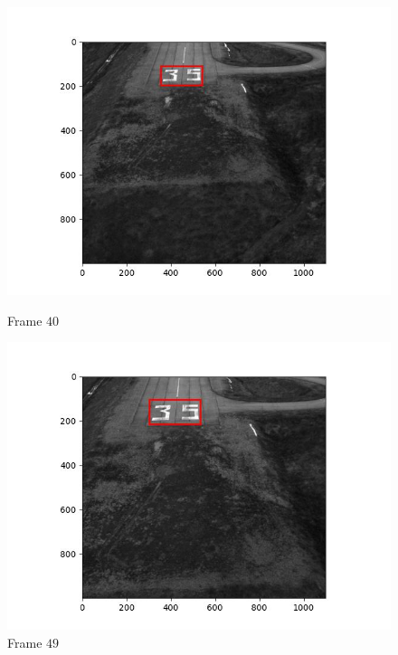 \begin{figure}[H]
\begin{minipage}{.49\textwidth}
    \includegraphics[width=\textwidth]{./figures/lk_affine/landing/frame000040.jpg}
    \caption{Frame $40$}
  \end{minipage}
  \hfill
  \begin{minipage}{.49\textwidth}
    \centering
    \includegraphics[width=\textwidth]{./figures/lk_affine/landing/frame000049.jpg}
    \caption{Frame $49$}
  \end{minipage}
\end{figure}


